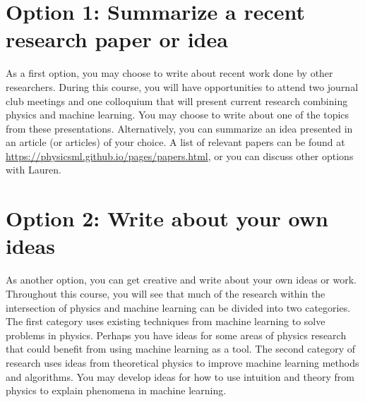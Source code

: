 \documentclass[letterpaper]{scrartcl}
\begin{document}
\section*{Option 1: Summarize a recent research paper or idea}
\vspace{-3mm}As a first option, you may choose to write about recent work done by other researchers.
During this course, you will have opportunities to attend 
two journal club meetings and one colloquium 
that will present current research combining physics and machine learning.
You may choose to write about one of the topics from these presentations.
Alternatively, you can summarize an idea presented in an article (or articles) of your choice.
A list of relevant papers can be found at
{\small\url{https://physicsml.github.io/pages/papers.html}},
or you can discuss other options with Lauren.

\section*{Option 2: Write about your own ideas}
\vspace{-3mm}As another option, you can get creative and write about your own ideas or work. 
Throughout this course, you will see that much of the research within the intersection of physics and machine learning
can be divided into two categories.
The first category uses existing techniques from machine learning to solve problems in physics.
Perhaps you have ideas for some areas of physics research that could benefit from using machine learning as a tool.
The second category of research uses ideas from theoretical physics to improve machine learning methods and algorithms.  
You may develop ideas for how to use intuition and theory from physics to explain phenomena in machine learning.
\end{document}

